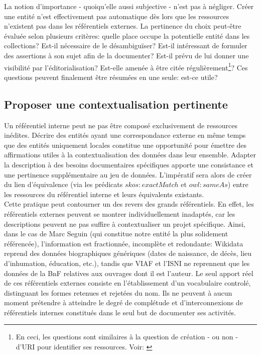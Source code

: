 \documentclass[a4paper,12pt,twoside]{book}
\begin{document}
La notion d'\og importance \fg{} - quoiqu'elle aussi subjective - n'est pas à négliger. Créer une entité n'est effectivement pas automatique dès lors que les ressources n'existent pas dans les référentiels externes. La pertinence du choix peut-être évaluée selon plusieurs critères: quelle place occupe la potentielle entité dans les collections? Est-il nécessaire de le désambiguïser? Est-il intéressant de formuler des assertions à son sujet afin de la documenter? Est-il prévu de lui donner une visibilité par l'éditorialisation? Est-elle amenée à être citée régulièrement\footnote{En ceci, les questions sont similaires à la question de création - ou non - d'URI pour identifier ses ressources. Voir: \cite[p.~3]{ministeredelacultureetdelacommunicationIdentifiantsPerennesPour2014}}? Ces questions peuvent finalement être résumées en une seule: est-ce utile?\\


\subsection{Proposer une contextualisation pertinente}
Un référentiel interne peut ne pas être composé exclusivement de ressources inédites. Décrire des entités ayant une correspondance externe en même temps que des entités uniquement locales constitue une opportunité pour émettre des affirmations utiles à la contextualisation des données dans leur ensemble. Adapter la description à des besoins documentaires spécifiques apporte une consistance et une pertinence supplémentaire au jeu de données. L'impératif sera alors de créer du lien d'équivalence (via les prédicats {$skos{:}exactMatch$} et {$owl{:}sameAs$}) entre les ressources du référentiel interne et leurs équivalents existants.\\

Cette pratique peut contourner un des revers des grands référentiels. En effet, les référentiels externes peuvent se montrer individuellement inadaptés, car les descriptions peuvent ne pas suffire à contextualiser un projet spécifique. Ainsi, dans le cas de Marc Seguin (qui constitue notre entité la plus solidement référencée), l'information est fractionnée, incomplète et redondante: Wikidata reprend des données biographiques génériques (dates de naissance, de décès, lieu d'inhumation, éducation, etc.), tandis que VIAF et l'ISNI ne reprennent que les données de la BnF relatives aux ouvrages dont il est l'auteur. Le seul apport réel de ces référentiels externes consiste en l'établissement d'un vocabulaire controlé, distinguant les formes retenues et rejetées du nom. Ils ne peuvent à aucun moment prétendre à atteindre le degré de complétude et d'interconnexions de référentiels internes constitués dans le seul but de documenter ses activités.\\
\end{document}
